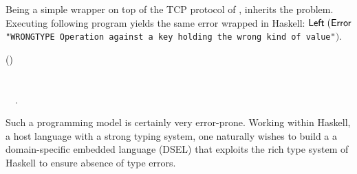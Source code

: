 Being a simple wrapper on top of the TCP protocol of \Redis{}, \Hedis{}
inherits the problem. Executing following program yields the same error
wrapped in Haskell: \ensuremath{\Conid{Left}\;(\Conid{Error}} \texttt{"WRONGTYPE Operation against a
key holding the wrong kind of value"}\ensuremath{)}.
\begin{hscode}\SaveRestoreHook
{}%
%
%
\>[B]{}\mathbin{::}\;(\;\;){}\<[E]%
\\
\>[B]{}\mathrel{=}\<[E]%
\\
\>[B]{}\<[5]%
\>[5]{}\;\;\<[E]%
\\
\>[B]{}\<[5]%
\>[5]{}\;~~.{}\<[E]%
\ColumnHook
\end{hscode}\resethooks

%
%
Such a programming model is certainly very error-prone. Working within Haskell,
a host language with a strong typing system, one naturally wishes to build a
a domain-specific embedded language (DSEL) that exploits the rich type system
of Haskell to ensure absence of \Redis{} type errors.

